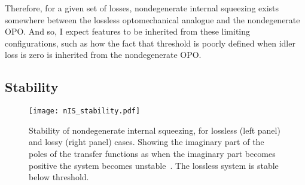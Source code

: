 Therefore, for a given set of losses, nondegenerate internal squeezing exists somewhere between the lossless optomechanical analogue and the nondegenerate OPO. And so, I expect features to be inherited from these limiting configurations, such as how the fact that threshold is poorly defined when idler loss is zero is inherited from the nondegenerate OPO.


\subsection{Stability}
\label{sec:nIS_stability}

\begin{figure}
	\centering
	\texttt{[image: nIS\_stability.pdf]}
	\caption{  Stability of nondegenerate internal squeezing, for lossless (left panel) and lossy (right panel) cases. Showing the imaginary part of the poles of the transfer functions as when the imaginary part becomes positive the system becomes unstable~\cite{}. The lossless system is stable below threshold. }
	\label{fig:nIS_stability}
\end{figure}

